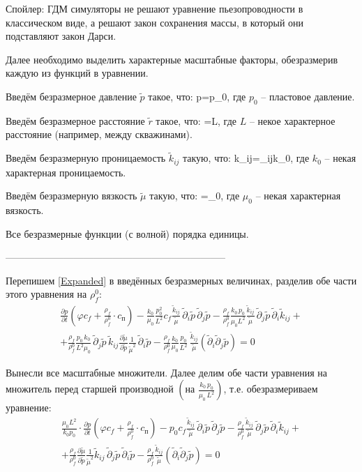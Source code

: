 \documentclass[main.tex]{subfiles}
\begin{document}
Спойлер: ГДМ симуляторы не решают уравнение пьезопроводности в классическом виде, а решают закон сохранения массы, в который они подставляют закон Дарси.

Далее необходимо выделить характерные масштабные факторы, обезразмерив каждую из функций в уравнении.

Введём безразмерное давление $\tilde{p}$ такое, что:
\beq
p=\cdot p_0,
\eeq
где $p_0$ -- пластовое давление.

Введём безразмерное расстояние $\tilde{r}$ такое, что:
\beq
{}=\cdot L,
\eeq
где $L$ -- некое характерное расстояние (например, между скважинами).

Введём безразмерную проницаемость $\tilde{k}_{ij}$ такую, что:
\beq
k_{ij}=_{ij}\cdot k_0,
\eeq
где $k_0$ -- некая характерная проницаемость.

Введём безразмерную вязкость $\tilde{\mu}$ такую, что:
\beq
\mu=\tilde{\mu}\cdot\mu_0,
\eeq
где $\mu_0$ -- некая характерная вязкость.

Все безразмерные функции (с волной) порядка единицы.

--------------------------------------------------------------------

Перепишем \eqref{Expanded} в введённых безразмерных величинах, разделив обе части этого уравнения на $\rho_f^0$:
\begin{multline}
\frac{\partial p}{\partial t}\left(\varphi c_f+\frac{\rho_f}{\rho_f^0}\cdot c_\text{п}\right)-\frac{k_0}{\mu_0}\frac{p_0^2}{L^2}c_f\frac{\tilde{k}_{ij}}{\tilde{\mu}}\,\tilde{\partial}_i\tilde{p}\,\tilde{\partial}_j\tilde{p}-\frac{\rho_f}{\rho_f^0}\frac{k_0\,p_0}{\mu_0L^2}\frac{\tilde{k}_{ij}}{\tilde{\mu}}\,\tilde{\partial}_j\tilde{p}\,\tilde{\partial}_i\tilde{k}_{ij}+\\+\frac{\rho_f}{\rho_f^0}\frac{p_0\,k_0}{L^2\mu_0}\,\tilde{\partial}_j\tilde{p}\,\tilde{k}_{ij}\frac{\partial\tilde{\mu}}{\partial\tilde{p}}\frac{1}{\tilde{\mu}^2}\,\tilde{\partial}_i\tilde{p}-\frac{\rho_f}{\rho_f^0}\frac{k_0}{\mu_0}\frac{p_0}{L^2}\,\frac{\tilde{k}_{ij}}{\tilde{\mu}}\left(\tilde{\partial}_i\tilde{\partial}_j\tilde{p}\right)=0
\end{multline}

Вынесли все масштабные множители. Далее делим обе части уравнения на множитель перед старшей производной $\left(\text{на }\frac{k_0\,p_0}{\mu_0\,L^2}\right)$, т.е. обезразмериваем уравнение:
\begin{multline}\label{PiezoEqDiv}
\frac{\mu_0L^2}{k_0p_0}\cdot\frac{\partial p}{\partial t}\left(\varphi c_f+\frac{\rho_f}{\rho_f^0}\cdot c_\text{п}\right)-p_0c_f\frac{\tilde{k}_{ij}}{\tilde{\mu}}\,\tilde{\partial}_i\tilde{p}\,\tilde{\partial}_j\tilde{p}-\frac{\rho_f}{\rho_f^0}\frac{\tilde{k}_{ij}}{\tilde{\mu}}\,\tilde{\partial}_j\tilde{p}\,\tilde{\partial}_i\tilde{k}_{ij}+\\+\frac{\rho_f}{\rho_f^0}\frac{\partial\tilde{\mu}}{\partial\tilde{p}}\frac{1}{\tilde{\mu}^2}\tilde{k}_{ij}\,\tilde{\partial}_j\tilde{p}\,\tilde{\partial}_i\tilde{p}-\frac{\rho_f}{\rho_f^0}\frac{\tilde{k}_{ij}}{\tilde{\mu}}\left(\tilde{\partial}_i\tilde{\partial}_j\tilde{p}\right)=0
\end{multline}
\end{document}
